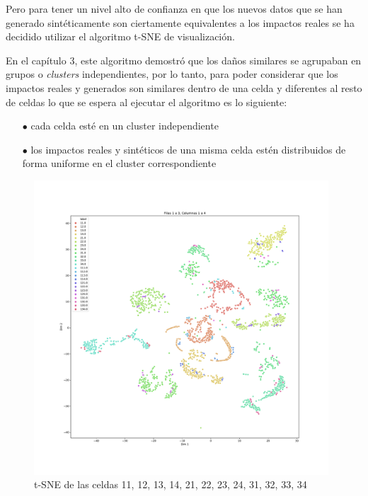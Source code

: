 Pero para tener un nivel alto de confianza en que los nuevos datos que se han generado sintéticamente son ciertamente equivalentes a los impactos reales se ha decidido utilizar el algoritmo t-SNE de visualización.

En el capítulo 3, este algoritmo demostró que los daños similares se agrupaban en grupos o \textit{clusters} independientes, por lo tanto, para poder considerar que los impactos reales y generados son similares dentro de una celda y diferentes al resto de celdas lo que se espera al ejecutar el algoritmo es lo siguiente:

\begin{itemize}
    \item[$\bullet$] cada celda esté en un cluster independiente
    \item[$\bullet$] los impactos reales y sintéticos de una misma celda estén distribuidos de forma uniforme en el cluster correspondiente
\end{itemize}

\begin{figure}[H]
    \centering
    \includegraphics[width=110mm, angle=0]{4/Fotos/tsne_TimeGAN_13-14.pdf}
    \captionsetup{justification=centering,margin=1.25cm}
    \caption{t-SNE de las celdas 11, 12, 13, 14, 21, 22, 23, 24, 31, 32, 33, 34}
    \label{fig:13-14}
\end{figure}

